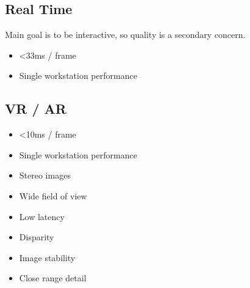 \subsection{Real Time}
Main goal is to be interactive, so quality is a secondary concern.
\begin{itemize}
	\item <33ms / frame
	\item Single workstation performance
\end{itemize}

\subsection{VR / AR}
\begin{itemize}
	\item <10ms / frame
	\item Single workstation performance
	\item Stereo images
	\item Wide field of view
	\item Low latency
	\item Disparity
	\item Image stability
	\item Close range detail	
\end{itemize}
